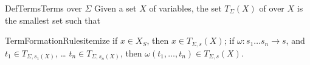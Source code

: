 {DefTerms}{Terms over $\Sigma$}{}
Given a set $X$ of variables, the set $T_\Sigma(X)$ of
 over $X$ is the smallest set such that 
\begin{List}{TermFormationRules}{itemize}{}
  \ListItem{}
  if $x\in X_S$, then $x\in T_{\Sigma, s}(X)$;
  \ListItem{}
  if $\omega:s_1\ldots s_n\rightarrow s$, and
  $t_1\in T_{\Sigma,{s_1}(X)}$, \ldots
  $t_n\in T_{\Sigma,{s_n}(X)}$, then 
  $\omega(t_1,\ldots, t_n)\in T_{\Sigma,s}(X)$.
\end{List}

